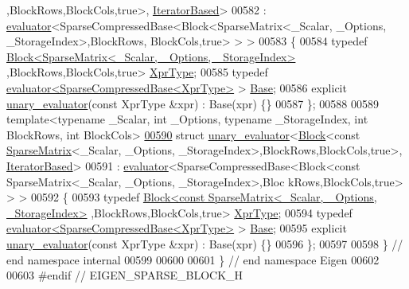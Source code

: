 \begin{DoxyCode}
      ,BlockRows,BlockCols,true>, \hyperlink{struct_eigen_1_1internal_1_1_iterator_based}{IteratorBased}>
00582   : \hyperlink{struct_eigen_1_1internal_1_1evaluator}{evaluator}<SparseCompressedBase<Block<SparseMatrix<\_Scalar, \_Options, \_StorageIndex>,BlockRows,
      BlockCols,true> > >
00583 \{
00584   \textcolor{keyword}{typedef} \hyperlink{group___core___module_class_eigen_1_1_block}{Block<SparseMatrix<\_Scalar, \_Options, \_StorageIndex>}
      ,BlockRows,BlockCols,\textcolor{keyword}{true}> \hyperlink{group___core___module_class_eigen_1_1_block}{XprType};
00585   \textcolor{keyword}{typedef} \hyperlink{struct_eigen_1_1internal_1_1evaluator}{evaluator<SparseCompressedBase<XprType>} > 
      \hyperlink{struct_eigen_1_1internal_1_1evaluator}{Base};
00586   \textcolor{keyword}{explicit} \hyperlink{struct_eigen_1_1internal_1_1unary__evaluator}{unary\_evaluator}(\textcolor{keyword}{const} XprType &xpr) : Base(xpr) \{\}
00587 \};
00588 
00589 \textcolor{keyword}{template}<\textcolor{keyword}{typename} \_Scalar, \textcolor{keywordtype}{int} \_Options, \textcolor{keyword}{typename} \_StorageIndex, \textcolor{keywordtype}{int} BlockRows, \textcolor{keywordtype}{int} BlockCols>
\hyperlink{struct_eigen_1_1internal_1_1unary__evaluator_3_01_block_3_01const_01_sparse_matrix_3_01___scalarcdbc8f3eebef46901de7cc88abb0e702}{00590} \textcolor{keyword}{struct }\hyperlink{struct_eigen_1_1internal_1_1unary__evaluator}{unary\_evaluator}<\hyperlink{group___core___module_class_eigen_1_1_block}{Block}<const \hyperlink{group___sparse_core___module_class_eigen_1_1_sparse_matrix}{SparseMatrix}<\_Scalar, \_Options, 
      \_StorageIndex>,BlockRows,BlockCols,true>, \hyperlink{struct_eigen_1_1internal_1_1_iterator_based}{IteratorBased}>
00591   : \hyperlink{struct_eigen_1_1internal_1_1evaluator}{evaluator}<SparseCompressedBase<Block<const SparseMatrix<\_Scalar, \_Options, \_StorageIndex>,Bloc
      kRows,BlockCols,true> > >
00592 \{
00593   \textcolor{keyword}{typedef} \hyperlink{group___core___module_class_eigen_1_1_block}{Block<const SparseMatrix<\_Scalar, \_Options, \_StorageIndex>}
      ,BlockRows,BlockCols,\textcolor{keyword}{true}> \hyperlink{group___core___module_class_eigen_1_1_block}{XprType};
00594   \textcolor{keyword}{typedef} \hyperlink{struct_eigen_1_1internal_1_1evaluator}{evaluator<SparseCompressedBase<XprType>} > 
      \hyperlink{struct_eigen_1_1internal_1_1evaluator}{Base};
00595   \textcolor{keyword}{explicit} \hyperlink{struct_eigen_1_1internal_1_1unary__evaluator}{unary\_evaluator}(\textcolor{keyword}{const} XprType &xpr) : Base(xpr) \{\}
00596 \};
00597 
00598 \} \textcolor{comment}{// end namespace internal}
00599 
00600 
00601 \} \textcolor{comment}{// end namespace Eigen}
00602 
00603 \textcolor{preprocessor}{#endif // EIGEN\_SPARSE\_BLOCK\_H}
\end{DoxyCode}
